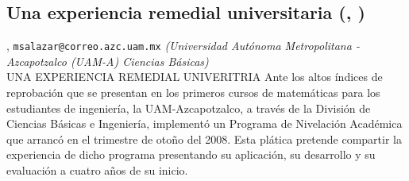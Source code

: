 \subsection{\sffamily Una experiencia remedial universitaria {\footnotesize (, )}} \label{reg-1789} 
, {\tt msalazar@correo.azc.uam.mx}  {\slshape (Universidad Autónoma Metropolitana - Azcapotzalco (UAM-A) Ciencias Básicas)}\\
          \noindent  UNA EXPERIENCIA REMEDIAL UNIVERITRIA Ante los altos índices de reprobación que se presentan en los primeros cursos de matemáticas para los estudiantes de ingeniería, la UAM-Azcapotzalco, a través de la División de Ciencias Básicas e Ingeniería, implementó un Programa de Nivelación Académica que arrancó en el trimestre de otoño del 2008. Esta plática pretende compartir la experiencia de dicho programa presentando su aplicación, su desarrollo y su evaluación a cuatro años de su inicio. 
